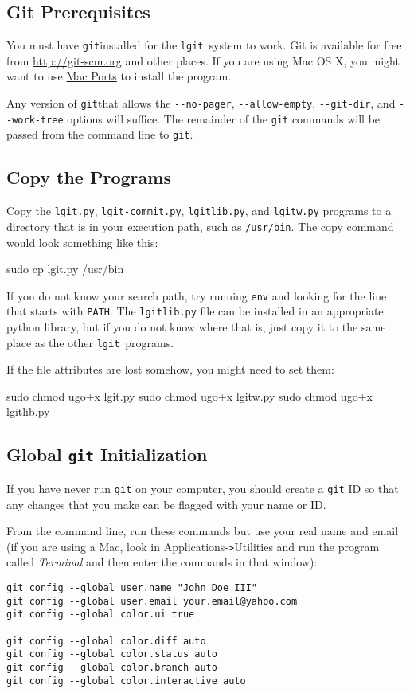 \documentclass{ltxdoc}
\def\ucmd#1{{\tt {#1}}}
\def\rab{{\tt >}}%
\def\lgit{{\tt lgit}}
\begin{document}
\subsection{Git Prerequisites}
You must have \ucmd{git}installed for the \lgit\ system to work.  Git is available for free from \url{http://git-scm.org} and other places.  If you are using Mac OS X, you might want to use \href{http://macports.org}{Mac Ports} to install the program.

Any version of \ucmd{git}that allows the \verb|--no-pager|, \verb|--allow-empty|, \verb|--git-dir|, and \verb|--work-tree| options will suffice.  The remainder of the \ucmd{git} commands will be passed from the command line to \ucmd{git}.
\subsection{Copy the Programs}
\label{copypgm}Copy the \ucmd{lgit.py}, \ucmd{lgit-commit.py}, \ucmd{lgitlib.py}, and \ucmd{lgitw.py} programs to a directory that is in your execution path, such as \ucmd{/usr/bin}.  The copy command would look something like this:
\begin{verb}
sudo cp lgit.py /usr/bin
\end{verb}

If you do not know your search path, try running \ucmd{env} and looking for the line that starts with \ucmd{PATH}. The \ucmd{lgitlib.py} file can be installed in an appropriate python library, but if you do not know where that is, just copy it to the same place as the other \lgit\ programs.

If the file attributes are lost somehow, you might need to set them:
\begin{verb}
sudo chmod ugo+x lgit.py
sudo chmod ugo+x lgitw.py
sudo chmod ugo+x lgitlib.py
\end{verb}
\subsection{Global \ucmd{git} Initialization}
\label{gitglobal}If you have never run \ucmd{git} on your computer, you should create a \ucmd{git} ID so that any changes that you make can be flagged with your name or ID.

From the command line, run these commands but use your real name and email (if you are using a Mac, look in Applications-\rab Utilities and run the program called \emph{Terminal} and then enter the commands in that window):
\begin{verbatim}
git config --global user.name "John Doe III"
git config --global user.email your.email@yahoo.com
git config --global color.ui true

git config --global color.diff auto
git config --global color.status auto
git config --global color.branch auto
git config --global color.interactive auto
\end{verbatim}
\end{document}
